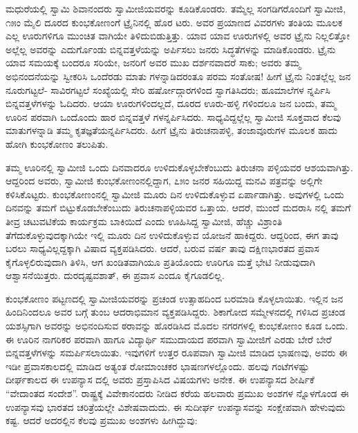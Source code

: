 ಮಧುರೆಯಲ್ಲಿ ಸ್ವಾಮಿ ಶಿವಾನಂದರು ಸ್ವಾಮೀಜಿಯವರನ್ನು ಕೂಡಿಕೊಂಡರು. ತಮ್ಮೆಲ್ಲ ಸಂಗಡಿಗರೊಂದಿಗೆ ಸ್ವಾಮೀಜಿ, ೧೫ಂ ಮೈಲಿ ದೂರದ ಕುಂಭಕೋಣಂಗೆ ಟ್ರೈನಿನಲ್ಲಿ ಹೊರ ಟರು. ಅವರ ಪ್ರಯಾಣದ ವಿವರಗಳು ತಂತಿಯ ಮೂಲಕ ಎಲ್ಲ ಊರುಗಳಿಗೂ ಮುಂಚಿತ ವಾಗಿಯೇ ತಿಳಿದುಬಿಡುತ್ತಿತ್ತು. ಯಾವ ಯಾವ ಊರುಗಳಲ್ಲಿ ಅವರ ಟ್ರೈನು ನಿಲ್ಲಲಿತ್ತೋ ಅಲ್ಲೆಲ್ಲ ಅವರನ್ನು ಎದುರ್ಗೊಂಡು ಬಿನ್ನವತ್ತಳೆಯನ್ನು ಅರ್ಪಿಸಲು ಜನರು ಸಿದ್ಧತೆಗಳನ್ನು ಮಾಡಿಕೊಂಡರು. ಟ್ರೈನು ಯಾವ ಸಮಯಕ್ಕೆ ಬಂದರೂ ಸರಿಯೇ, ಜನರಿಗೆ ಅವರ ಮುಖ ದರ್ಶನವಾದರೆ ಸಾಕು; ಅವರು ತಮ್ಮ ಅಭಿನಂದನೆಯನ್ನು ಸ್ವೀಕರಿಸಿ ಒಂದೆರಡು ಮಾತು ಗಳನ್ನಾಡಿದರಂತೂ ಪರಮ ಸಂತೋಷ! ಹೀಗೆ ಟ್ರೈನು ನಿಂತಲ್ಲೆಲ್ಲ ಜನ ನೂರುಗಟ್ಟಲೆ- ಸಾವಿರಗಟ್ಟಲೆ ಸಂಖ್ಯೆಯಲ್ಲಿ ಸೇರಿ ಹರ್ಷೋದ್ಗಾರಗಳಿಂದ ಸ್ವಾಗತಿಸಿದರು; ಹೂಮಾಲೆಗಳ ನ್ನರ್ಪಿಸಿ ಬಿನ್ನವತ್ತಳೆಗಳನ್ನು ಓದಿದರು. ಆಯಾ ಊರುಗಳಿಂದಲ್ಲದೆ, ದೂರದ ಊರು-ಹಳ್ಳಿ ಗಳಿಂದಲೂ ಜನ ಬಂದು, ತಮ್ಮ ಊರಿನ ಪರವಾಗಿ ಒಂದೊಂದು ಹಾರ ಬಿನ್ನವತ್ತಳೆ ಗಳನ್ನರ್ಪಿಸಿದರು. ಸಾಧ್ಯವಿದ್ದಲ್ಲೆಲ್ಲ ಸ್ವಾಮೀಜಿ ಸೂಕ್ತವಾದ ಕೆಲವು ಮಾತುಗಳನ್ನಾಡಿ ತಮ್ಮ ಕೃತಜ್ಞತೆಯನ್ನರ್ಪಿಸಿದರು. ಹೀಗೆ ಟ್ರೈನು ತಿರುಚನಾಪಳ್ಳಿ, ತಂಜಾವೂರುಗಳ ಮೂಲಕ ಹಾದು ಹೋಗಿ ಕುಂಭಕೋಣಂ ತಲುಪಿತು.

ತಮ್ಮ ಊರಿನಲ್ಲಿ ಸ್ವಾಮೀಜಿ ಒಂದು ದಿನವಾದರೂ ಉಳಿದುಕೊಳ್ಳಬೇಕೆಂಬುದು ತಿರುಚನಾ ಪಳ್ಳಿಯವರ ಆಶಯವಾಗಿತ್ತು. ಆದ್ದರಿಂದ ಅವರು, ಸ್ವಾಮೀಜಿ ಕುಂಭಕೋಣಂನಲ್ಲಿದ್ದಾಗ, ೭೫ಂ ಜನರ ಸಹಿಯಿದ್ದ ಮನವಿ ಪತ್ರವನ್ನು ಅಲ್ಲಿಗೇ ಕಳಿಸಿಕೊಟ್ಟರು. ಕುಂಭಕೋಣಂನಲ್ಲಿ ಸ್ವಾಮೀಜಿ ಮೂರು ದಿನ ಉಳಿದುಕೊಳ್ಳುವ ಏರ್ಪಾಡಾಗಿತ್ತು. ಅವುಗಳಲ್ಲಿ ಒಂದು ದಿನವನ್ನು ತಮಗೆ ಬಿಟ್ಟುಕೊಡಬೇಕೆಂಬುದು ತಿರುಚನಾಪಳ್ಳಿಯವರ ಒತ್ತಾಯ. ಆದರೆ, ಮುಂದೆ ಮದರಾಸಿ ನಲ್ಲಿ ತಮಗೆ ತೀವ್ರ ಚಟುವಟಿಕೆಯ ಕಾರ್ಯಕ್ರಮ ಬಾಕಿಯಿದೆ ಎಂದು ಊಹಿಸಿದ್ದ ಸ್ವಾಮೀಜಿ, ಹೆಚ್ಚು ವಿಶ್ರಾಂತಿ ತೆಗೆದುಕೊಳ್ಳುವುದಕ್ಕಾಗಿಯೇ ಇಲ್ಲಿ ಮೂರು ದಿನ ಉಳಿದುಕೊಳ್ಳುವ ಯೋಜನೆ ಹಾಕಿದ್ದರು. ಆದ್ದರಿಂದ, ಈಗ ತಾವು ಬರಲು ಸಾಧ್ಯವಿಲ್ಲದ್ದಕ್ಕಾಗಿ ವಿಷಾದ ವ್ಯಕ್ತಪಡಿಸಿದರು. ಆದರೆ, ಬರುವ ವರ್ಷ ತಾವು ದಕ್ಷಿಣಭಾರತದ ಪ್ರವಾಸ ಕೈಗೊಳ್ಳಲಿರುವುದಾಗಿ ತಿಳಿಸಿ, ಆಗ ಖಂಡಿತವಾಗಿಯೂ ಪ್ರತಿಯೊಂದು ಊರಿಗೂ ಮತ್ತೆ ಭೇಟಿ ನೀಡುವುದಾಗಿ ಆಶ್ವಾಸನೆಯಿತ್ತರು. ದುರದೃಷ್ಟವಶಾತ್, ಈ ಪ್ರವಾಸ ಎಂದೂ ಕೈಗೂಡಲಿಲ್ಲ.

ಕುಂಭಕೋಣಂ ಪಟ್ಟಣದಲ್ಲಿ ಸ್ವಾಮೀಜಿಯವರನ್ನು ಪ್ರಚಂಡ ಉತ್ಸಾಹದಿಂದ ಬರಮಾಡಿ ಕೊಳ್ಳಲಾಯಿತು. ಇಲ್ಲಿನ ಜನ ಹಿಂದಿನಿಂದಲೂ ಅವರ ಬಗ್ಗೆ ತುಂಬ ಆದರಾಭಿಮಾನ ವ್ಯಕ್ತಪಡಿಸಿದ್ದರು. ಶಿಕಾಗೋದ ಸಮ್ಮೇಳನದಲ್ಲಿ ಗಳಿಸಿದ ಪ್ರಚಂಡ ಯಶಸ್ಸಿಗಾಗಿ ಅವರನ್ನು ಅಭಿನಂದಿಸುವ ಠರಾವನ್ನು ಹೊರಡಿಸಿದ ಮೊದಲ ನಗರಗಳಲ್ಲಿ ಕುಂಭಕೋಣಂ ಕೂಡ ಒಂದು. ಈ ಊರಿನ ನಾಗರಿಕರ ಪರವಾಗಿ ಹಾಗೂ ವಿದ್ಯಾರ್ಥಿ ಸಮುದಾಯದ ಪರವಾಗಿ ಸ್ವಾಮೀಜಿಗೆ ಎರಡು ಬೇರೆ ಬೇರೆ ಬಿನ್ನವತ್ತಳೆಗಳನ್ನು ಸಮರ್ಪಿಸಲಾಯಿತು. ಇವುಗಳಿಗೆ ಉತ್ತರ ರೂಪವಾಗಿ ಸ್ವಾಮೀಜಿ ಮಾಡಿದ ಭಾಷಣವು, ಅವರು ಈ ಇಡೀ ಪ್ರವಾಸಕಾಲದಲ್ಲಿ ಮಾಡಿದ ಅತ್ಯಂತ ರೋಮಾಂಚಕರ ಭಾಷಣಗಳಲ್ಲೊಂದು. ಹಲವು ಗಂಟೆಗಳಷ್ಟು ದೀರ್ಘಕಾಲದ ಈ ಉಪನ್ಯಾಸ ದಲ್ಲಿ ಅವರು ಪ್ರಸ್ತಾಪಿಸಿದ ವಿಷಯಗಳು ಅನೇಕ. ಈ ಉಪನ್ಯಾಸದ ಶೀರ್ಷಿಕೆ “ವೇದಾಂತದ ಸಂದೇಶ”. ರಾಷ್ಟ್ರಕ್ಕೆ ವಿವೇಕಾನಂದರು ನೀಡಿದ ಕರೆಯ ಹಲವಾರು ಪ್ರಮುಖ ಅಂಶಗಳ ನ್ನೊಳಗೊಂಡ ಈ ಉಪನ್ಯಾಸವು ಭಾರತದ ಚರಿತ್ರೆಯಲ್ಲೇ ವಿಶೇಷವಾದುದು. ಈ ಸುದೀರ್ಘ ಉಪನ್ಯಾಸವನ್ನು ಸಂಕ್ಷೇಪವಾಗಿ ಹೇಳುವುದು ಕಷ್ಟ. ಆದರೆ ಅದರಲ್ಲಿನ ಕೆಲವು ಪ್ರಮುಖ ಅಂಶಗಳು ಹೀಗಿದ್ದುವು:

